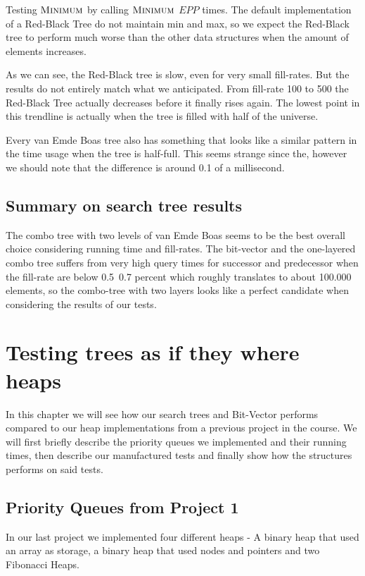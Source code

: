 \documentclass[oneside,11pt,openright]{report}
\newcommand{\Minimum}{\textsc{Minimum}}
\begin{document}
Testing $\Minimum$ by calling $\Minimum$ $EPP$ times. The default implementation of a Red-Black Tree do not maintain min and max, so we expect the Red-Black tree to perform much worse than the other data structures when the amount of elements increases.



As we can see, the Red-Black tree is slow, even for very small fill-rates. But the results do not entirely match what we anticipated. From fill-rate 100 to 500 the Red-Black Tree actually decreases before it finally rises again. The lowest point in this trendline is actually when the tree is filled with half of the universe.

Every van Emde Boas tree also has something that looks like a similar pattern in the time usage when the tree is half-full. This seems strange since the, however we should note that the difference is around 0.1 of a millisecond.

\section{Summary on search tree results}

The combo tree with two levels of van Emde Boas seems to be the best overall choice considering running time and fill-rates. The bit-vector and the one-layered combo tree suffers from very high query times for successor and predecessor when the fill-rate are below 0.5~0.7 percent which roughly translates to about 100.000 elements, so the combo-tree with two layers looks like a perfect candidate when considering the results of our tests.

\chapter{Testing trees as if they where heaps}

In this chapter we will see how our search trees and Bit-Vector performs compared to our heap implementations from a previous project in the course. We will first briefly describe the priority queues we implemented and their running times, then describe our manufactured tests and finally show how the structures performs on said tests.

\section{Priority Queues from Project 1}

In our last project we implemented four different heaps - A binary heap that used an array as storage, a binary heap that used nodes and pointers and two Fibonacci Heaps.
\end{document}
